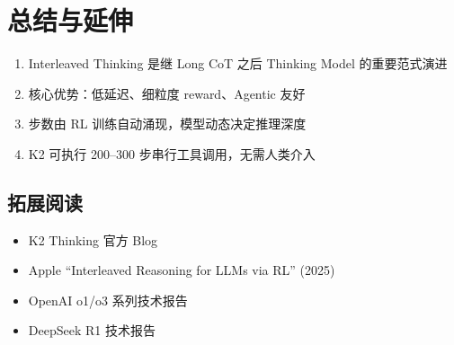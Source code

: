 \section{总结与延伸}

\begin{enumerate}
  \item Interleaved Thinking 是继 Long CoT 之后 Thinking Model 的重要范式演进
  \item 核心优势：低延迟、细粒度 reward、Agentic 友好
  \item 步数由 RL 训练自动涌现，模型动态决定推理深度
  \item K2 可执行 200--300 步串行工具调用，无需人类介入
\end{enumerate}

\subsection{拓展阅读}

\begin{itemize}
  \item K2 Thinking 官方 Blog
  \item Apple ``Interleaved Reasoning for LLMs via RL'' (2025)
  \item OpenAI o1/o3 系列技术报告
  \item DeepSeek R1 技术报告
\end{itemize}


